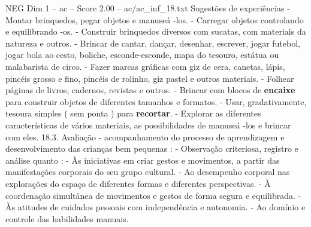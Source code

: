 \begin{textsample}{NEG Dim 1 – ac – Score 2.00 – ac/ac\_inf\_18.txt}
Sugestões de experiências - Montar brinquedos, pegar objetos e manuseá -los. - Carregar objetos controlando e equilibrando -os. - Construir brinquedos diversos com sucatas, com materiais da natureza e outros. - Brincar de cantar, dançar, desenhar, escrever, jogar futebol, jogar bola ao cesto, boliche, esconde-esconde, mapa do tesouro, estátua ou malabarista de circo. - Fazer marcas gráficas com giz de cera, canetas, lápis, pincéis grosso e fino, pincéis de rolinho, giz pastel e outros materiais. - Folhear páginas de livros, cadernos, revistas e outros. - Brincar com blocos de \textbf{encaixe} para construir objetos de diferentes tamanhos e formatos. - Usar, gradativamente, tesoura simples ( sem ponta ) para \textbf{recortar}. - Explorar as diferentes características de vários materiais, as possibilidades de manuseá -los e brincar com eles. 18.3.
Avaliação - acompanhamento do processo de aprendizagem e desenvolvimento das crianças bem pequenas : - Observação criteriosa, registro e análise quanto : - Às iniciativas em criar gestos e movimentos, a partir das manifestações corporais do seu grupo cultural. - Ao desempenho corporal nas explorações do espaço de diferentes formas e diferentes perspectivas. - À coordenação simultânea de movimentos e gestos de forma segura e equilibrada. - Às atitudes de cuidados pessoais com independência e autonomia. - Ao domínio e controle das habilidades manuais.

\end{textsample}
